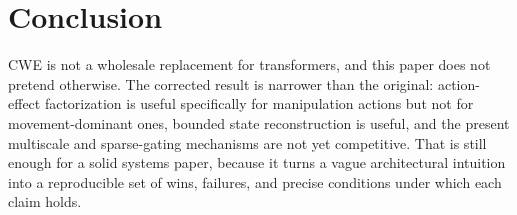 \documentclass[11pt]{article}
\begin{document}
\section{Conclusion}
CWE is not a wholesale replacement for transformers, and this paper does not pretend otherwise. The corrected result is narrower than the original: action-effect factorization is useful specifically for manipulation actions but not for movement-dominant ones, bounded state reconstruction is useful, and the present multiscale and sparse-gating mechanisms are not yet competitive. That is still enough for a solid systems paper, because it turns a vague architectural intuition into a reproducible set of wins, failures, and precise conditions under which each claim holds.



\end{document}
